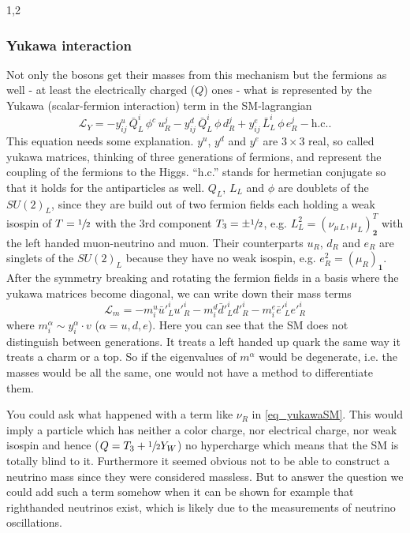 \documentclass[11pt,a4paper,twoside]{article}
\begin{document}
\begin{spacing}{1,2}
\subsubsection*{Yukawa interaction}
Not only the bosons get their masses from this mechanism but the fermions as well - at least the electrically charged ($Q$) ones - what is represented by the
Yukawa (scalar-fermion interaction) term in the SM-lagrangian
\begin{equation}
 \mathcal{L}_{Y} = - y^u_{ij}\, \bar Q^i_L \, \phi^c\, u^j_R - y^d_{ij}\, \bar Q^i_L\, \phi\, d^j_R + y^e_{ij}\, \bar L^i_L\, \phi\, e^j_R - \text{h.c.}.
 \label{eq_yukawaSM}
\end{equation}
\noindent
This equation needs some explanation. $y^u$, $y^d$ and $y^e$ are $3\times 3$ real, so called yukawa matrices, thinking of three generations of fermions, and represent the 
coupling of the fermions to the Higgs. ``h.c.'' stands for hermetian conjugate so that it holds for the antiparticles as well. 
$Q_L$, $L_L$ and $\phi$ are doublets of the $SU(2)_L$, since they are build out of two fermion fields each holding a 
weak isospin of $T=\sfrac12$ with the 3rd component $T_3 = \pm\sfrac12$, e.g. $L^2_L = (\nu_{\mu\, L}, \mu_L)^T_{\textbf{2}}$ with the left handed muon-neutrino and muon. 
Their counterparts $u_R$, $d_R$ and $e_R$ are singlets of the $SU(2)_L$ because they have no weak isospin, e.g. $e^2_R = (\mu_R)_{\textbf{1}}$. After 
the symmetry breaking and rotating the fermion fields in a basis where the yukawa matrices become diagonal, we can write down their mass terms 
\begin{equation}
 \mathcal{L}_m = -m^u_i \bar u'^i_L u'^i_R -m^d_i \bar d'^i_L d'^i_R -m^e_i \bar e'^i_L e'^i_R 
 \label{eq_massSM}
\end{equation}
\noindent
where $m^\alpha_i \sim y^\alpha_i \cdot v$ ($\alpha = u,d,e$). Here you can see that the SM does not distinguish between generations. 
It treats a left handed up quark the same way it treats a charm or a top. So if the eigenvalues of $m^\alpha$ would be degenerate, i.e. the masses would
be all the same, one would not have a method to differentiate them. 

\vspace{-0.3cm}
You could ask
what happened with a term like $\nu_R$ in \eqref{eq_yukawaSM}. This would imply a particle which has neither a color charge, nor electrical charge, nor 
weak isospin and hence ($Q = T_3 + \sfrac12 Y_W$) no hypercharge which means that the SM is totally blind to it. Furthermore it seemed obvious not to be
able to construct a neutrino mass since they were considered massless. But to answer the question we could add 
such a term somehow when it can be shown for example that righthanded neutrinos exist, which is likely due to the measurements of neutrino oscillations.
\vspace{1cm}

\end{spacing}
\end{document}
